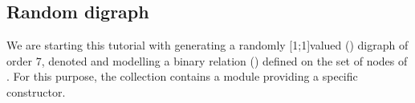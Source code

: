 \documentclass[a4paper,12pt,english]{sphinxhowto}
\begin{document}
\subsection{Random digraph}
\label{\detokenize{tutorial:random-digraph}}
We are starting this tutorial with generating a randomly {[}\sphinxhyphen{}1;1{]}\sphinxhyphen{}valued () digraph of order 7, denoted  and modelling a binary relation () defined on the set of nodes of . For this purpose, the  collection contains a  module providing a specific  constructor.

\begin{sphinxVerbatim}[commandchars=\\\{\},numbers=left,firstnumber=1,stepnumber=1]
   
  
\end{sphinxVerbatim}
\end{document}
